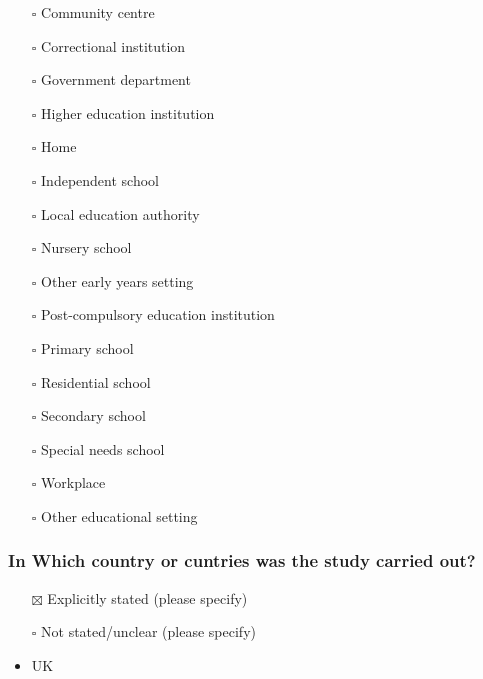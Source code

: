 \documentclass[
  doc, a4paper]{apa7}
\providecommand{\tightlist}{%
  \setlength{\itemsep}{0pt}\setlength{\parskip}{0pt}}
\begin{document}
\begin{itemize}
\tightlist
\item[$\square$]
  Community centre\\
\item[$\square$]
  Correctional institution\\
\item[$\square$]
  Government department\\
\item[$\square$]
  Higher education institution\\
\item[$\square$]
  Home\\
\item[$\square$]
  Independent school\\
\item[$\square$]
  Local education authority\\
\item[$\square$]
  Nursery school\\
\item[$\square$]
  Other early years setting\\
\item[$\square$]
  Post-compulsory education institution\\
\item[$\square$]
  Primary school\\
\item[$\square$]
  Residential school\\
\item[$\square$]
  Secondary school\\
\item[$\square$]
  Special needs school\\
\item[$\square$]
  Workplace\\
\item[$\square$]
  Other educational setting
\end{itemize}

\subsubsection{In Which country or cuntries was the study carried out?}\label{in-which-country-or-cuntries-was-the-study-carried-out}

\begin{itemize}
\item[$\boxtimes$]
  Explicitly stated (please specify)\\
\item[$\square$]
  Not stated/unclear (please specify)
\item
  UK
\end{itemize}
\end{document}
